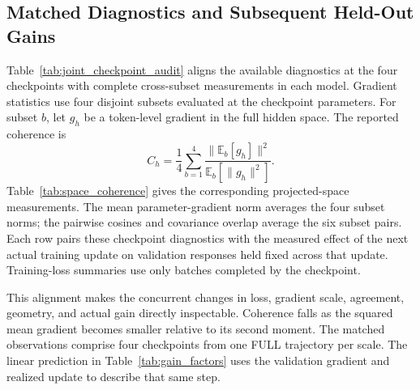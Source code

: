 \subsection{Matched Diagnostics and Subsequent Held-Out Gains}
\label{app:matched_diagnostics}
Table~\ref{tab:joint_checkpoint_audit} aligns the available diagnostics at the four checkpoints with complete cross-subset measurements in each model. Gradient statistics use four disjoint subsets evaluated at the checkpoint parameters. For subset $b$, let $g_h$ be a token-level gradient in the full hidden space. The reported coherence is
\begin{equation}
 C_h=\frac14\sum_{b=1}^4
 \frac{\|\mathbb E_b[g_h]\|^2}{\mathbb E_b[\|g_h\|^2]}.
\end{equation}
Table~\ref{tab:space_coherence} gives the corresponding projected-space measurements. The mean parameter-gradient norm averages the four subset norms; the pairwise cosines and covariance overlap average the six subset pairs. Each row pairs these checkpoint diagnostics with the measured effect of the next actual training update on validation responses held fixed across that update. Training-loss summaries use only batches completed by the checkpoint.

This alignment makes the concurrent changes in loss, gradient scale, agreement, geometry, and actual gain directly inspectable. Coherence falls as the squared mean gradient becomes smaller relative to its second moment. The matched observations comprise four checkpoints from one FULL trajectory per scale. The linear prediction in Table~\ref{tab:gain_factors} uses the validation gradient and realized update to describe that same step.



